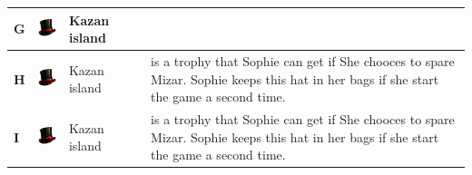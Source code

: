\begin{longtable}[H]{|p{2cm}|p{1.5cm}|p{2cm}|p{2.8cm}|p{6.3cm}|}
\textbf{G}                           & \includegraphics[width=1.4cm]{Images/Hats/magic}              & Kazan island                                                   &                                                                                       &                                                                                                                                        \\ \hline
\textbf{H}                           & \includegraphics[width=1.4cm]{Images/Hats/magic}              & Kazan island                                                   &                                                                                       & is a trophy that Sophie can get if She chooces to spare Mizar.  Sophie keeps this hat in her bags if she start the game a second time. \\ \hline
\textbf{I}                           & \includegraphics[width=1.4cm]{Images/Hats/magic}              & Kazan island                                                   &                                                                                       & is a trophy that Sophie can get if She chooces to spare Mizar. Sophie keeps this hat in her bags if she start the game a second time.  \\ \hline
\end{longtable}

